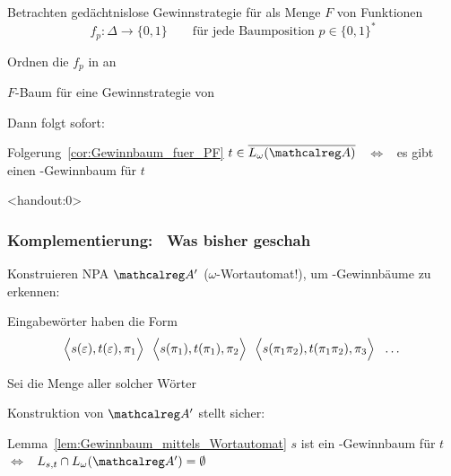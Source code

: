 {\begin{frame}
    \begin{Itemize}
      \item
        Betrachten gedächtnislose Gewinnstrategie für \PF als Menge $F$ von Funktionen
        \[
          f_p : \Delta \to \{0,1\}\qquad \text{für jede Baumposition~} p \in \{0,1\}^*
        \]
      \item
        Ordnen die $f_p$ in  an %
        
        
      \item
         $F$-Baum für eine Gewinnstrategie von \PF
    \end{Itemize}

    \par\bigskip
    Dann folgt sofort:

    \begin{block}{Folgerung~\ref{cor:Gewinnbaum_fuer_PF}}
      $t \in \overline{L_\omega(\Aut{A})}$ ~$\Leftrightarrow$~ es gibt einen \PF-Gewinnbaum für $t$%
    \end{block}

  \end{frame}

  \begin{frame}<handout:0>
    \frametitle{Komplementierung:~ Was bisher geschah \hfill \Rewind\Rewind}
    \addtocounter{framenumber}{-1}%

    Konstruieren NPA $\Aut{A}'$ ($\omega$-Wortautomat!), um \PF-Gewinnbäume zu erkennen:
    \begin{Itemize}
      \item
        Eingabewörter haben die Form
        \[
          \Big\langle s(\varepsilon), t(\varepsilon), \pi_1\Big\rangle~~
          \Big\langle s(\pi_1), t(\pi_1), \pi_2\Big\rangle~~
          \Big\langle s(\pi_1\pi_2), t(\pi_1\pi_2), \pi_3\Big\rangle~~
          \dots
        \]
      \item
        Sei \Bmph{\Lst} die Menge aller solcher Wörter
    \end{Itemize}

    \par\bigskip
    Konstruktion von $\Aut{A}'$ stellt sicher:
    \begin{block}{Lemma~\ref{lem:Gewinnbaum_mittels_Wortautomat}}
      $s$ ist ein \PF-Gewinnbaum für $t$
      ~$\Leftrightarrow$~
      $\Lst \cap L_\omega(\Aut{A}') = \emptyset$
    \end{block}
    

\end{frame}}
